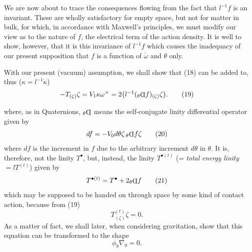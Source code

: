 \documentclass[11pt]{article}
\newcommand{\invd}{\mathord{\vcenter{\hbox{\rotatebox[origin=c]{180}{\(\mathrm{D}\)}}}}}
\newcommand{\thetaPi}{{}_\theta\invd}
\begin{document}
\indent We are now about to trace the consequences flowing from the fact that $l^{-1}f$ is an invariant. These are wholly satisfactory for empty space, but not for matter in bulk, for which, in accordance with Maxwell's principles, we must modify our view as to the nature of $f$, the electrical term of the action density. It is well to show, however, that it is this invariance of $l^{-1}f$ which causes the inadequacy of our present supposition that $f$ is a function of $\dot\omega$ and $\theta$ only.

\indent With our present (vacuum) assumption, we shall show that (18) can be added to, thus ($\kappa=l^{-1}\dot\kappa$)
\begin{equation}
  -T_{(\zeta)}\zeta=V_1\kappa\omega^\times
  =2\bigl(l^{-1}(\thetaPi f)_{(\zeta)}\zeta\bigr).
  \tag{19}
\end{equation}

where, as in Quaternions, $\thetaPi$ means the self-conjugate linity differential operator given by
\begin{equation}
  df=-V_0d\theta\zeta\,\thetaPi f\zeta
  \tag{20}
\end{equation}
where $df$ is the increment in $f$ due to the arbitrary increment $d\theta$ in $\theta$. It is, therefore, not the linity $T^\bullet$, but, instead, the linity $T^{\bullet(t)}$ (= \emph{total energy linity} $=lT^{(t)}$) given by
\begin{equation}
  T^{\bullet(t)}=T^\bullet+2\thetaPi f
  \tag{21}
\end{equation}
which may be supposed to be handed on through space by some kind of contact action, because from (19)
\begin{equation}
  T_{(\zeta)}^{(t)}\zeta=0.
  \tag{22}
\end{equation}
As a matter of fact, we shall later, when considering gravitation, show that this equation can be transformed to the shape
\[
  \phi_9\nabla_9=0.
\]
\end{document}
